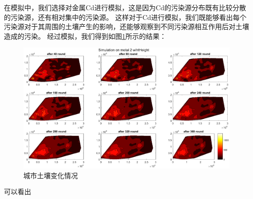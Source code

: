 \documentclass[a4paper]{article}
\begin{document}
在模拟中，我们选择对金属Cd进行模拟，这是因为Cd的污染源分布既有比较分散的污染源，还有相对集中的污染源。
这样对于Cd进行模拟，我们既能够看出每个污染源对于其周围的土壤产生的影响，还能够观察到不同污染源相互作用后对土壤造成的污染。
经过模拟，我们得到如图\ref{fig:pollution-with-hight}所示的结果：
\begin{figure}
    \flushleft
    \includegraphics[scale=0.5]{pictures/pollution-with-hight-Cd.eps}
    \caption{城市土壤变化情况}
    \label{fig:pollution-with-hight}
\end{figure}
可以看出
\end{document}
